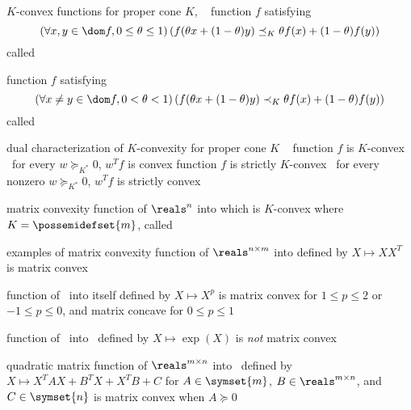 \documentclass[17pt,landscape]{foils}
\begin{document}
{

\begin{mydefinition}{$K$-convex functions}
	for proper cone $K$,
\shrinkspacewithintheoremslike\
\ibit
\iitem
	function $f$ satisfying
	$$
		\left(
			\forall x,y \in \dom f, 0\leq \theta\leq 1
		\right)
		\left(
			f(\theta x + (1-\theta) y)
			\preceq_K
			\theta f(x) + (1-\theta) f(y)
		\right)
	$$
	called 

\iitem
	function $f$ satisfying
	$$
		\left(
			\forall x\neq y \in \dom f, 0< \theta< 1
		\right)
		\left(
			f(\theta x + (1-\theta) y)
			\prec_K
			\theta f(x) + (1-\theta) f(y)
		\right)
	$$
	called 
\eit
\end{mydefinition}

\begin{myproposition}{dual characterization of $K$-convexity}
	for proper cone $K$
	\shrinkspacewithintheoremslike\
	\ibit
	\iitem
		function $f$ is $K$-convex \iaoi\ for every $w\succeq_{K^\ast}0$, $w^Tf$ is convex
	\iitem
		function $f$ is strictly $K$-convex \iaoi\ for every nonzero $w\succeq_{K^\ast}0$, $w^Tf$ is strictly convex
	\eit
\end{myproposition}




\begin{mydefinition}{matrix convexity}
	function of $\reals^n$ into 
	which is $K$-convex where $K=\possemidefset{m}$,
	called \define{matrix convex}
\end{mydefinition}

\bit
\vitem
	examples of matrix convexity
	\bit
	\vitem
		function of $\reals^{n\times m}$ into 
		defined by $X\mapsto XX^T$
		is matrix convex\

	\vitem
		function of \ into itself
		defined by $X\mapsto X^p$
		is matrix convex for $1\leq p\leq 2$ or $-1\leq p \leq0$,
		and matrix concave for $0\leq p\leq1$

	\vitem
		function of \ into \
		defined by $X\mapsto \exp(X)$
		is \emph{not} matrix convex

	\vitem
		quadratic matrix function of $\reals^{m\times n}$ into \
		defined by $X\mapsto X^TAX + B^TX + X^TB + C$
		for $A\in\symset{m}$, $B\in\reals^{m\times n}$, and $C\in\symset{n}$
		is matrix convex when $A\succeq0$
	\eit
\eit
\vfill


}
\end{document}
